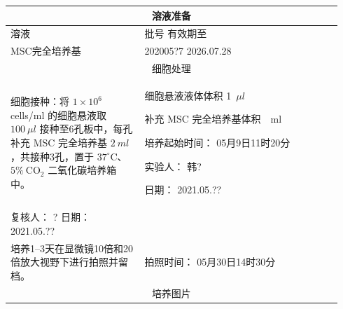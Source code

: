 \documentclass[UTF8,10pt,a4paper,fontset=fandol]{ctexart}
\newcommand{\fieldvalue}[1]{#1}
\newcommand{\handwritten}[1]{#1}
\begin{document}
\begin{tabular}{|p{0.38\linewidth}|p{0.56\linewidth}|}
\hline
\multicolumn{2}{|c|}{溶液准备} \\ \hline
溶液 & 批号 \hfill 有效期至 \\ \hline
\fieldvalue{MSC完全培养基} &
\fieldvalue{\handwritten{202005?7}}
\hfill
\fieldvalue{\handwritten{2026.07.28}} \\ \hline
\multicolumn{2}{|c|}{细胞处理} \\ \hline
\begin{minipage}[t]{0.36\linewidth}
细胞接种：将 $1\times10^{6}$ cells/ml 的细胞悬液取 $100~\mu l$ 接种至6孔板中，每孔补充 MSC 完全培养基 $2~ml$，共接种3孔，置于 $37^\circ\mathrm{C}$、$5\%~\mathrm{CO}_{2}$ 二氧化碳培养箱中。
\end{minipage}
&
\begin{minipage}[t]{0.54\linewidth}
细胞悬液液体体积\quad
\fieldvalue{\handwritten{1}}~$\mu l$

补充 MSC 完全培养基体积\quad
\fieldvalue{\handwritten{\,}}~ml

培养起始时间：
\fieldvalue{\handwritten{05月9日11时20分}}

实验人：
\fieldvalue{\handwritten{韩?}}

日期：
\fieldvalue{\handwritten{2021.05.??}}
\end{minipage}
\\ \hline
复核人：
\fieldvalue{\handwritten{?}}
\quad 日期：
\fieldvalue{\handwritten{2021.05.??}}
&
\\ \hline
\begin{minipage}[t]{0.36\linewidth}
培养1--3天在显微镜10倍和20倍放大视野下进行拍照并留档。
\end{minipage}
&
拍照时间：
\fieldvalue{\handwritten{05月30日14时30分}} \\ \hline
\multicolumn{2}{|c|}{培养图片} \\ \hline
\end{tabular}
\end{document}
